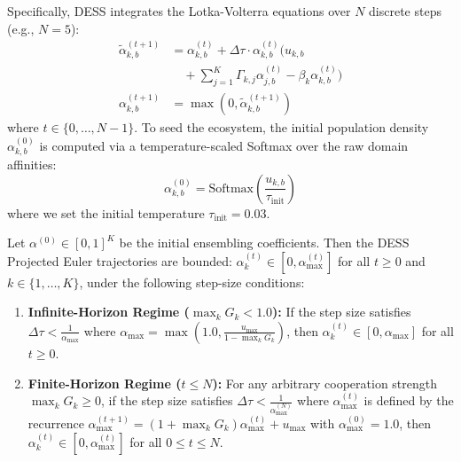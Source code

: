 Specifically, DESS integrates the Lotka-Volterra equations over $N$ discrete steps (e.g., $N=5$):
\begin{align}
    \tilde{\alpha}_{k, b}^{(t+1)} &= \alpha_{k, b}^{(t)} + \Delta \tau \cdot \alpha_{k, b}^{(t)} \Big( u_{k, b} \nonumber \\
    &\quad + \sum_{j=1}^K \Gamma_{k, j} \alpha_{j, b}^{(t)} - \beta_k \alpha_{k, b}^{(t)} \Big) \\
    \alpha_{k, b}^{(t+1)} &= \max\left(0, \tilde{\alpha}_{k, b}^{(t+1)}\right)
\end{align}
where $t \in \{0, \dots, N-1\}$. To seed the ecosystem, the initial population density $\alpha_{k, b}^{(0)}$ is computed via a temperature-scaled Softmax over the raw domain affinities:
\begin{equation}
    \alpha^{(0)}_{k, b} = \text{Softmax}\left(\frac{u_{k, b}}{\tau_{\text{init}}}\right)
\end{equation}
where we set the initial temperature $\tau_{\text{init}} = 0.03$. 

\begin{theorem}
\label{thm:dess_boundedness}
Let $\alpha^{(0)} \in [0, 1]^K$ be the initial ensembling coefficients. Then the DESS Projected Euler trajectories are bounded: $\alpha^{(t)}_k \in [0, \alpha_{\max}^{(t)}]$ for all $t \geq 0$ and $k \in \{1,\dots,K\}$, under the following step-size conditions:
\begin{enumerate}
    \item \textbf{Infinite-Horizon Regime ($\max_k G_k < 1.0$):} If the step size satisfies $\Delta \tau < \frac{1}{\alpha_{\max}}$ where $\alpha_{\max} = \max\left(1.0, \frac{u_{\max}}{1 - \max_k G_k}\right)$, then $\alpha^{(t)}_k \in [0, \alpha_{\max}]$ for all $t \geq 0$.
    \item \textbf{Finite-Horizon Regime ($t \leq N$):} For any arbitrary cooperation strength $\max_k G_k \geq 0$, if the step size satisfies $\Delta \tau < \frac{1}{\alpha_{\max}^{(N)}}$ where $\alpha_{\max}^{(t)}$ is defined by the recurrence $\alpha_{\max}^{(t+1)} = (1 + \max_k G_k) \alpha_{\max}^{(t)} + u_{\max}$ with $\alpha_{\max}^{(0)} = 1.0$, then $\alpha^{(t)}_k \in [0, \alpha_{\max}^{(t)}]$ for all $0 \leq t \leq N$.
\end{enumerate}
\end{theorem}

